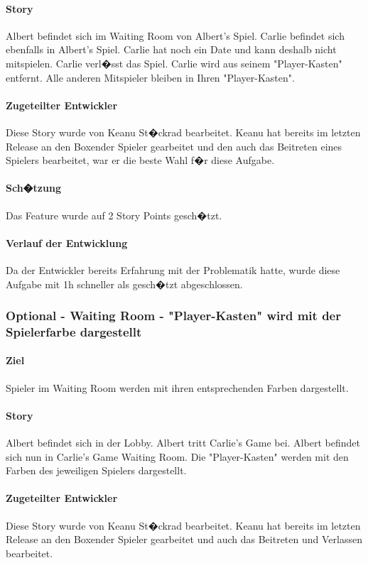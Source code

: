 \documentclass[12pt, titlepage]{scrartcl}
\begin{document}
			\paragraph{Story} Albert befindet sich im Waiting Room von Albert's Spiel. Carlie befindet sich ebenfalls in Albert's Spiel. Carlie hat noch ein Date und kann deshalb nicht mitspielen. Carlie verl�sst das Spiel. Carlie wird aus seinem "Player-Kasten" entfernt. Alle anderen Mitspieler bleiben in Ihren "Player-Kasten".
			\paragraph{Zugeteilter Entwickler} Diese Story wurde von Keanu St�ckrad bearbeitet. Keanu hat bereits im letzten Release an den \glqq Boxen\grqq der Spieler gearbeitet und den auch das Beitreten eines Spielers bearbeitet, war er die beste Wahl f�r diese Aufgabe.
			\paragraph{Sch�tzung}
			Das Feature wurde auf 2 Story Points gesch�tzt.
			\paragraph{Verlauf der Entwicklung} 
			Da der Entwickler bereits Erfahrung mit der Problematik hatte, wurde diese Aufgabe mit 1h schneller als gesch�tzt abgeschlossen.
			
			\subsubsection{Optional - Waiting Room - "Player-Kasten" wird mit der Spielerfarbe dargestellt}
			\paragraph{Ziel} Spieler im Waiting Room werden mit ihren entsprechenden Farben dargestellt.
			\paragraph{Story} Albert befindet sich in der Lobby. Albert tritt Carlie's Game bei. Albert befindet sich nun in Carlie's Game Waiting Room. Die "Player-Kasten" werden mit den Farben des jeweiligen Spielers dargestellt.
			\paragraph{Zugeteilter Entwickler} Diese Story wurde von Keanu St�ckrad bearbeitet. Keanu hat bereits im letzten Release an den \glqq Boxen\grqq der Spieler gearbeitet und auch das Beitreten und Verlassen bearbeitet.
\end{document}
